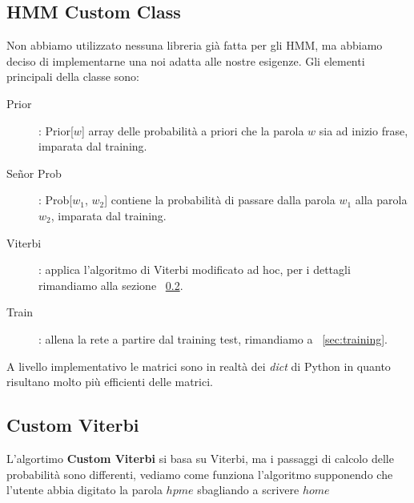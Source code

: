 \subsection{HMM Custom Class}
Non abbiamo utilizzato nessuna libreria gi\`a fatta per gli HMM, ma 
abbiamo deciso di implementarne una noi adatta alle nostre esigenze.
Gli elementi principali della classe sono:
\begin{description}
  \item[Prior]: Prior[$w$] array delle probabilit\`a a priori che la 
  parola $w$ sia ad inizio frase, imparata dal training.
  \item[Señor Prob]: Prob[$w_1$, $w_2$] contiene la probabilit\`a 
  di passare dalla parola $w_1$ alla parola $w_2$, imparata dal training.
  \item[Viterbi]: applica l'algoritmo di Viterbi modificato ad hoc,
  per i dettagli rimandiamo alla sezione ~\ref{sec:vitello}.
  \item[Train]: allena la rete a partire dal training test,
  rimandiamo a ~\ref{sec:training}.
\end{description}
A livello implementativo le matrici sono in realt\`a dei \textit{dict} di 
Python in quanto risultano molto pi\`u efficienti delle matrici.


\subsection{Custom Viterbi}
\label{sec:vitello}
L'algortimo \textbf{Custom Viterbi} si basa su Viterbi, ma i passaggi 
di calcolo delle probabilit\`a sono differenti, vediamo come funziona
l'algoritmo supponendo che l'utente abbia digitato la parola $hpme$ 
sbagliando a scrivere $home$

